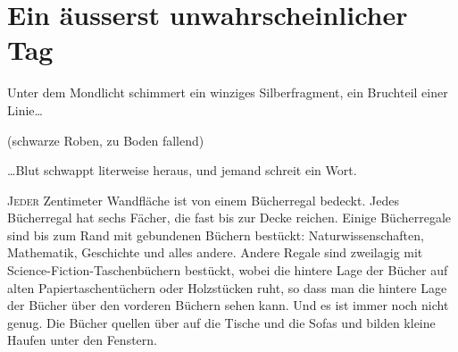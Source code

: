 \chapter[Ein äußerst unwahrscheinlicher Tag]{Ein äusserst unwahrscheinlicher Tag}


\begin{chapterOpeningQuote}
\noindent
Unter dem Mondlicht schimmert ein winziges Silberfragment, ein Bruchteil einer Linie…

\vspace*{2ex}
(schwarze Roben, zu Boden fallend)

\vspace*{2ex}
…Blut schwappt literweise heraus, und jemand schreit ein Wort.
\end{chapterOpeningQuote}

\lettrine{J}{eder} Zentimeter Wandfläche ist von einem Bücherregal bedeckt. Jedes Bücherregal hat sechs Fächer, die fast bis zur Decke reichen. Einige Bücherregale sind bis zum Rand mit gebundenen Büchern bestückt: Naturwissenschaften, Mathematik, Geschichte und alles andere. Andere Regale sind zweilagig mit Science-Fiction-Taschenbüchern bestückt, wobei die hintere Lage der Bücher auf alten Papiertaschentüchern oder Holzstücken ruht, so dass man die hintere Lage der Bücher über den vorderen Büchern sehen kann. Und es ist immer noch nicht genug. Die Bücher quellen über auf die Tische und die Sofas und bilden kleine Haufen unter den Fenstern.

